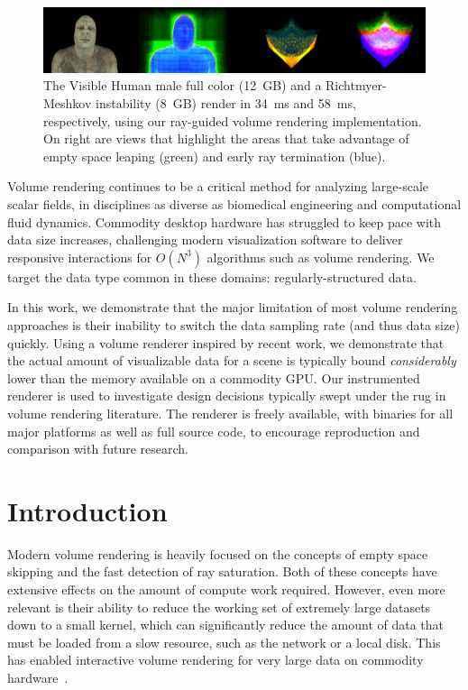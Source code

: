 \begin{figure}
  \includegraphics[draft=\isDraft, width=1.00\linewidth]{images/rg/teaser.png}
  \caption{The Visible Human male full color (\tjftilde{}12~GB) and
  a Richtmyer-Meshkov instability (\tjftilde{}8~GB) render in 34~ms
  and 58~ms, respectively, using our ray-guided volume rendering
  implementation.  On right are views that highlight the areas
  that take advantage of empty space leaping (green) and early ray
  termination (blue).}
  \label{fig:teaser}
\end{figure}

Volume rendering continues to be a critical method for analyzing
large-scale scalar fields, in disciplines as diverse as biomedical
engineering and computational fluid dynamics.
Commodity desktop hardware has struggled to keep pace with data
size increases, challenging modern visualization software to
deliver responsive interactions for $O(N^3)$ algorithms such as
volume rendering.  We target the data type common in these domains:
regularly-structured data.

In this work, we demonstrate that the major limitation of most volume
rendering approaches is their inability to switch the data sampling
rate (and thus data size) quickly.  Using a volume renderer inspired by
recent work, we demonstrate that the actual amount of visualizable data
for a
scene is typically bound \emph{considerably} lower than the memory
available on a commodity GPU.  Our instrumented renderer is used to
investigate design decisions typically swept under the rug in volume
rendering literature.  The renderer is freely available, with binaries
for all major platforms as well as full source code, to encourage
reproduction and comparison with future research.

\section{Introduction}

Modern volume rendering is heavily focused on the concepts of empty
space skipping and the fast detection of ray saturation.  Both of
these concepts have extensive effects on the amount of compute work
required.  However, even more relevant is their ability to reduce the
working set of extremely large datasets down to a small kernel, which
can significantly reduce the amount of data that must be loaded from a
slow resource, such as the network or a local disk.  This has enabled
interactive volume rendering for very large data on commodity
hardware~\cite{Knoll:2010:BVH, Hadwiger:2012:Guided,
Crassin:2009:Gigavoxels}.


